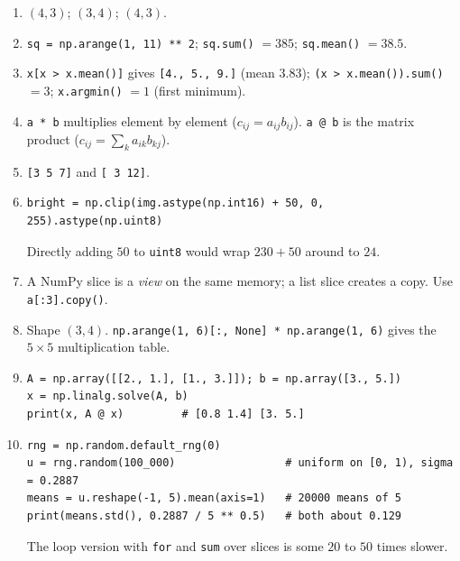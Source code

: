 \begin{enumerate}[label=\textbf{\ansnum.\arabic*}]
  \item $(4,3)$; $(3,4)$; $(4,3)$.
  \item \verb!sq = np.arange(1, 11) ** 2!; \verb!sq.sum()! $=385$; \verb!sq.mean()! $=38.5$.
  \item \verb!x[x > x.mean()]! gives \texttt{[4., 5., 9.]} (mean $3.83$); \verb!(x > x.mean()).sum()! $=3$; \verb!x.argmin()! $=1$ (first minimum).
  \item \texttt{a * b} multiplies element by element ($c_{ij}=a_{ij}b_{ij}$). \texttt{a @ b} is the matrix product ($c_{ij}=\sum_k a_{ik}b_{kj}$).
  \item \texttt{[3 5 7]} and \texttt{[ 3 12]}.
  \item
\begin{verbatim}
bright = np.clip(img.astype(np.int16) + 50, 0, 255).astype(np.uint8)
\end{verbatim}
  Directly adding $50$ to \texttt{uint8} would wrap $230+50$ around to $24$.
  \item A NumPy slice is a \emph{view} on the same memory; a list slice creates a copy. Use \verb!a[:3].copy()!.
  \item Shape $(3,4)$. \verb!np.arange(1, 6)[:, None] * np.arange(1, 6)! gives the $5\times5$ multiplication table.
  \item
\begin{verbatim}
A = np.array([[2., 1.], [1., 3.]]); b = np.array([3., 5.])
x = np.linalg.solve(A, b)
print(x, A @ x)         # [0.8 1.4] [3. 5.]
\end{verbatim}
  \item[\textbf{\ansnum.10}]
\begin{verbatim}
rng = np.random.default_rng(0)
u = rng.random(100_000)                 # uniform on [0, 1), sigma = 0.2887
means = u.reshape(-1, 5).mean(axis=1)   # 20000 means of 5
print(means.std(), 0.2887 / 5 ** 0.5)   # both about 0.129
\end{verbatim}
  The loop version with \texttt{for} and \texttt{sum} over slices is some $20$ to $50$ times slower.
\end{enumerate}
